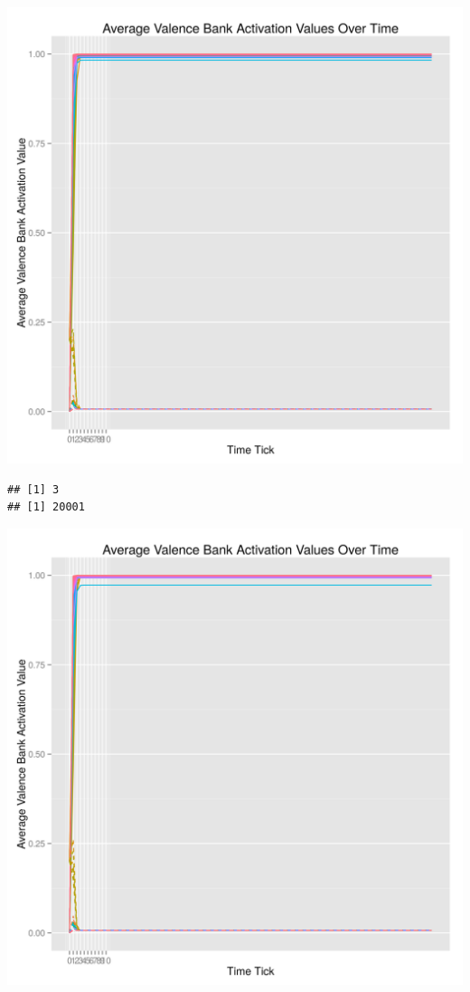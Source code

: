 \documentclass{article}\usepackage[]{graphicx}\usepackage[]{color}
\makeatletter
\def\maxwidth{ %
  \ifdim\Gin@nat@width>\linewidth
    \linewidth
  \else
    \Gin@nat@width
  \fi
}
\newenvironment{kframe}{%
 \def\at@end@of@kframe{}%
 \ifinner\ifhmode%
  \def\at@end@of@kframe{\end{minipage}}%
  \begin{minipage}{\columnwidth}%
 \fi\fi%
 \def\FrameCommand##1{\hskip\@totalleftmargin \hskip-\fboxsep
 \colorbox{shadecolor}{##1}\hskip-\fboxsep
     \hskip-\linewidth \hskip-\@totalleftmargin \hskip\columnwidth}%
 \MakeFramed {\advance\hsize-\width
   \@totalleftmargin\z@ \linewidth\hsize
   \@setminipage}}%
 {\par\unskip\endMakeFramed%
 \at@end@of@kframe}
\newenvironment{knitrout}{}{} %
\makeatother
\begin{document}
\begin{knitrout}
\includegraphics[width=\maxwidth]{figure/unnamed-chunk-22} 
\begin{kframe}\begin{verbatim}
## [1] 3
## [1] 20001
\end{verbatim}
\end{kframe}
\includegraphics[width=\maxwidth]{figure/unnamed-chunk-23} 

\end{knitrout}
\end{document}
